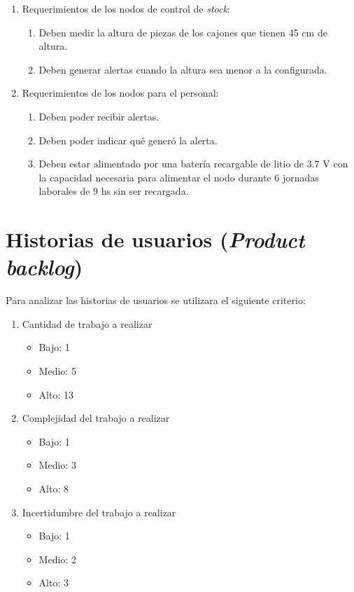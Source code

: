 \documentclass[11pt]{charter}
\begin{document}
\begin{enumerate}
\begin{enumerate}
    \end{enumerate}
    \item Requerimientos de los nodos de control de \textit{stock}:
    \begin{enumerate}
        \item Deben medir la altura de piezas de los cajones que tienen 45 cm de altura. 
        \item Deben generar alertas cuando la altura sea menor a la configurada.
    \end{enumerate}
    \item Requerimientos de los nodos para el personal:
    \begin{enumerate}
        \item Deben poder recibir alertas.
        \item Deben poder indicar qué generó la alerta.
        \item Deben estar alimentado por una batería recargable de litio de 3.7 V con la capacidad necesaria para alimentar el nodo durante 6 jornadas laborales de 9 hs sin ser recargada.
    \end{enumerate}
\end{enumerate}


\section{Historias de usuarios (\textit{Product backlog})}
\label{sec:backlog}

Para analizar las historias de usuarios se utilizara el siguiente criterio:
\renewcommand{\theenumi}{\Alph{enumi}}
\begin{enumerate}
    \item Cantidad de trabajo a realizar
    \begin{itemize}
        \item Bajo: 1
        \item Medio: 5
        \item Alto: 13
    \end{itemize}
    \item Complejidad del trabajo a realizar
    \begin{itemize}
        \item Bajo: 1
        \item Medio: 3
        \item Alto: 8
    \end{itemize}
    \item Incertidumbre del trabajo a realizar
    \begin{itemize}
        \item Bajo: 1
        \item Medio: 2
        \item Alto: 3
    \end{itemize}
\end{enumerate}
\end{document}

